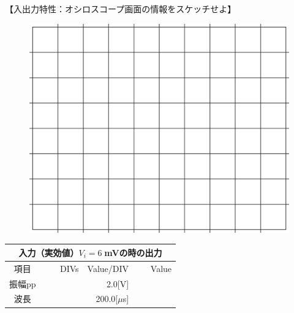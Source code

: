 \documentclass[uplatex,a4paper,11pt,oneside,openany]{jsbook}
\begin{document}
\newpage

【入出力特性：オシロスコープ画面の情報をスケッチせよ】

\begin{multicols}{2}
  \begin{figure}[H]
     \centering
      \includegraphics[keepaspectratio, scale=0.28, angle=0]
                  {figs/eps/grid.eps}
                  \label{fig:grid6mV}
  \end{figure}

  \begin{spacing}{1.5}
  \begin{tabular}{|c||r|r|r|}
    \multicolumn{4}{c}{入力（実効値）$V_i=6\;$mVの時の出力} \\ \hline
    項目 & DIVs & Value/DIV & Value \\ \hline \hline
    振幅pp & 　　　　 & 2.0[V]& 　　　　 \\ \hline
    波長 & 　　　　 & 200.0[$\mu$s]& 　　　　 \\ \hline
  \end{tabular}
\end{spacing}
\end{multicols}

\vfill
\end{document}

